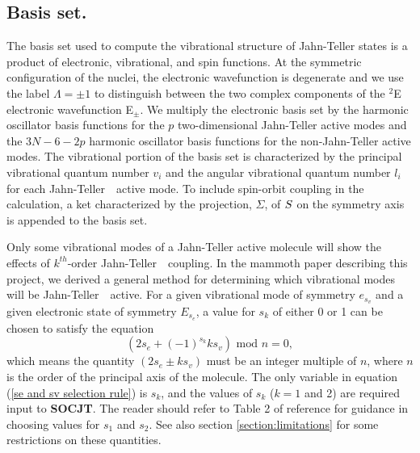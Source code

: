 \documentclass{article}
\newcommand{\JT}{Jahn-Teller\ }
\newcommand{\socjt}{{\bf SOCJT}}
\begin{document}
\subsection{Basis set.} The basis set used to compute the vibrational 
structure of Jahn-Teller states is a product of electronic, vibrational,
and spin functions. At the symmetric configuration of the nuclei, 
the electronic wavefunction is degenerate and we use the label
$\Lambda = \pm 1$ to distinguish between the 
two complex components of the $^2$E electronic wavefunction E$_\pm$. 
We multiply the electronic basis set by the harmonic oscillator basis
functions for the $p$ two-dimensional Jahn-Teller active modes and the
$3N-6-2p$ harmonic oscillator basis functions for the non-Jahn-Teller
active modes. The vibrational portion of the basis set is
characterized by the principal vibrational quantum number $v_i$ and
the angular vibrational quantum number $l_i$ for each \JT\ active mode.
To include spin-orbit coupling in the calculation,
a ket characterized by the projection, $\Sigma $, of ${\bf S}$ on the 
symmetry axis is appended to the basis set.

Only some vibrational modes of a Jahn-Teller active molecule will show
the effects of $k^{th}$-order \JT\ coupling. In the mammoth paper
describing this 
project, we derived a general method for determining which vibrational
modes will be \JT\ active. For a given vibrational mode of symmetry
$e_{s_v}$ and  a given electronic state of symmetry $E_{s_e}$, a value
for $s_k$ of either 0 or 1 can be chosen to satisfy the equation
\begin{equation}
\left( 2s_e + (-1)^{s_k } ks_v \right) \text{ mod } n=0,
\label{se and sv selection rule}
\end{equation}
which means the quantity $\left( 2s_e \pm ks_v \right) $
must be an integer multiple of $n$, where $n$ is the order of the
principal axis of the molecule. The only variable in equation (\ref{se
  and sv selection rule}) is $s_k$, and the values of $s_k$ ($k=1$ and 2)
are required input to \socjt . The reader should refer to Table 2 of
reference  for guidance in choosing values for $s_1$ and
$s_2$. See also section \ref{section:limitations} for some
restrictions on these quantities.
\end{document}
